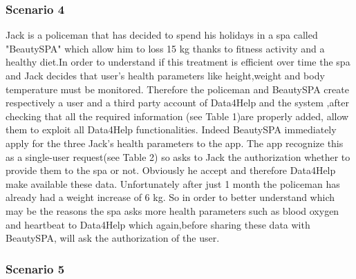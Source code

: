    \subsubsection{Scenario 4}

    Jack is a policeman that has decided to spend his holidays in a spa called "BeautySPA" which allow him to loss 15 kg thanks to fitness activity and a healthy diet.In order to understand if this treatment is efficient over time the spa and Jack decides that user's health parameters like height,weight and body temperature must be monitored. Therefore the policeman and BeautySPA create respectively a user and a third party account of Data4Help and the system ,after checking that all the required information (see Table 1)are properly added, allow them to exploit all Data4Help functionalities. Indeed  BeautySPA immediately apply for the three Jack's health parameters to the app. The app recognize this as a single-user request(see Table 2)  so asks to Jack the authorization whether to provide them to the spa or not. Obviously he accept and therefore Data4Help make available these data. Unfortunately after just 1 month the policeman has already had a weight increase of 6 kg. So in order to better understand which may be the reasons the spa asks more health parameters such as blood oxygen and heartbeat to Data4Help which again,before sharing these data with BeautySPA, will ask the authorization of the user.

\subsubsection{Scenario 5}

